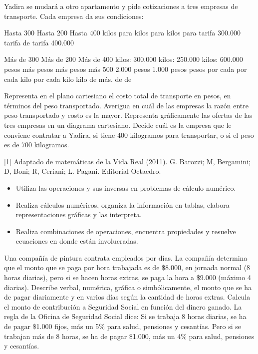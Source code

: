 \ejemplo

Yadira se mudará a otro apartamento y pide cotizaciones a tres empresas de transporte. Cada empresa da sus condiciones:

Hasta 300 Hasta 200 Hasta 400 kilos para kilos para kilos para tarifa 300.000 tarifa de tarifa 400.000


Más de 300 Más de 200 Más de 400 kilos: 300.000 kilos: 250.000 kilos: 600.000 pesos más pesos más pesos más 500 2.000 pesos 1.000 pesos pesos por cada por cada kilo por cada kilo kilo de más. de de

Representa en el plano cartesiano el costo total de transporte en pesos, en términos del peso transportado. Averigua en cuál de las empresas la razón entre peso transportado y costo es la mayor. Representa gráficamente las ofertas de las tres empresas en un diagrama cartesiano. Decide cuál es la empresa que le conviene contratar a Yadira, si tiene 400 kilogramos para transportar, o si el peso es de 700 kilogramos.

[1] Adaptado de matemáticas de la Vida Real (2011). G. Barozzi; M, Bergamini; D, Boni; R, Ceriani; L. Pagani. Editorial Octaedro.


\evidencias

\begin{itemize}
  \item Utiliza las operaciones y sus inversas en problemas de cálculo numérico.
  \item Realiza cálculos numéricos, organiza la información en tablas, elabora representaciones gráficas y las interpreta.
  \item Realiza combinaciones de operaciones, encuentra propiedades y resuelve ecuaciones en donde están involucradas.
\end{itemize}

\ejemplo

Una compañía de pintura contrata empleados por días. La compañía determina que el monto que se paga por hora trabajada es de \$8.000, en jornada normal (8 horas diarias), pero si se hacen horas extras, se paga la hora a \$9.000 (máximo 4 diarias). Describe verbal, numérica, gráfica o simbólicamente, el monto que se ha de pagar diariamente y en varios días según la cantidad de horas extras. Calcula el monto de contribución a Seguridad Social en función del dinero ganado. La regla de la Oficina de Seguridad Social dice: Si se trabaja 8 horas diarias, se ha de pagar \$1.000 fijos, más un 5\% para salud, pensiones y cesantías. Pero si se trabajan más de 8 horas, se ha de pagar \$1.000, más un 4\% para salud, pensiones y cesantías.

